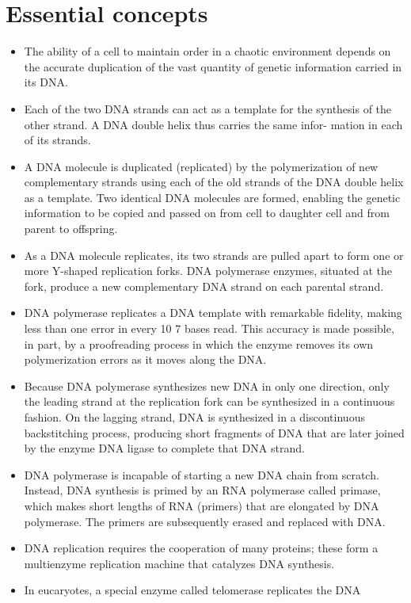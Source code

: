 \section{Essential concepts}

\begin{itemize}
\item The ability of a cell to maintain order in a chaotic environment
depends on the accurate duplication of the vast quantity of genetic
information carried in its DNA.
\item Each of the two DNA strands can act as a template for the synthesis
of the other strand. A DNA double helix thus carries the same infor-
mation in each of its strands.
\item A DNA molecule is duplicated (replicated) by the polymerization of
new complementary strands using each of the old strands of the DNA
double helix as a template. Two identical DNA molecules are formed,
enabling the genetic information to be copied and passed on from
cell to daughter cell and from parent to offspring.
\item As a DNA molecule replicates, its two strands are pulled apart to form
one or more Y-shaped replication forks. DNA polymerase enzymes,
situated at the fork, produce a new complementary DNA strand on
each parental strand.
\item DNA polymerase replicates a DNA template with remarkable fidelity,
making less than one error in every 10 7 bases read. This accuracy
is made possible, in part, by a proofreading process in which the
enzyme removes its own polymerization errors as it moves along the
DNA.
\item Because DNA polymerase synthesizes new DNA in only one direction,
only the leading strand at the replication fork can be synthesized in
a continuous fashion. On the lagging strand, DNA is synthesized in
a discontinuous backstitching process, producing short fragments of
DNA that are later joined by the enzyme DNA ligase to complete that
DNA strand.
\item DNA polymerase is incapable of starting a new DNA chain from
scratch. Instead, DNA synthesis is primed by an RNA polymerase
called primase, which makes short lengths of RNA (primers) that are
elongated by DNA polymerase. The primers are subsequently erased
and replaced with DNA.
\item DNA replication requires the cooperation of many proteins; these form
a multienzyme replication machine that catalyzes DNA synthesis.
\item In eucaryotes, a special enzyme called telomerase replicates the DNA

\end{itemize}
